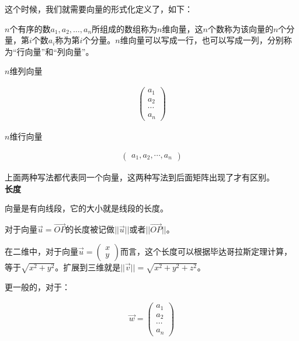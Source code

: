 \documentclass[UTF8]{ctexart}
\begin{document}
这个时候，我们就需要向量的形式化定义了，如下：

$n$个有序的数$a_{1},a_{2},\dots,a_{n}$所组成的数组称为$n$维向量，这$n$个数称为该向量的$n$个分量，第$i$个数$a_{i}$称为第$i$个分量。$n$维向量可以写成一行，也可以写成一列，分别称为“行向量”和“列向量”。

$n$维列向量

\begin{equation}
\begin{aligned}
\begin{pmatrix} 
a_{1}\\
a_{2}\\
\cdots\\
a_{n}
\end{pmatrix}
\end{aligned}
\end{equation}

$n$维行向量

\begin{equation}
\begin{aligned}
\begin{pmatrix}
a_{1},a_{2},\cdots,a_{n}
\end{pmatrix}
\end{aligned}
\end{equation}

上面两种写法都代表同一个向量，这两种写法到后面矩阵出现了才有区别。 \\

\textbf{长度}

向量是有向线段，它的大小就是线段的长度。 

对于向量$\vec{u}=\overrightarrow{OP}$的长度被记做$||\vec{u}||$或者$||\overrightarrow{OP}||$。

在二维中，对于向量$\vec{u}=\begin{pmatrix} x\\ y \end{pmatrix}$而言，这个长度可以根据毕达哥拉斯定理计算，等于$\sqrt{x^{2}+y^{2}}$。扩展到三维就是$||\vec{v}||=\sqrt{x^{2}+y^{2}+z^{2}}$。

更一般的，对于：

\begin{equation}
\begin{aligned}
\vec{w}=
\begin{pmatrix}
a_{1}\\
a_{2}\\
\cdots\\
a_{n}
\end{pmatrix}
\end{aligned}
\end{equation}
\end{document}
